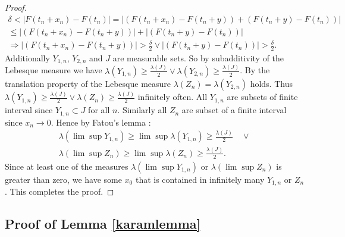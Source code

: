 \documentclass[english,12pt,a4paper,pdftex,sci,utf8]{aaltothesis} %
\begin{document}
\begin{proof}
\begin{equation*}
\begin{split}
\delta < \left| F(t_n+x_n) - F(t_n) \right| = \left| (F(t_n+x_n)-F(t_n+y)) + (F(t_n+y)-F(t_n)) \right| \\
\leq \left| (F(t_n+x_n)-F(t_n+y)) \right| + \left| (F(t_n+y)-F(t_n)) \right| \\
\Rightarrow \left| (F(t_n+x_n)-F(t_n+y)) \right|>\frac{\delta}{2} \lor \left| (F(t_n+y)-F(t_n)) \right|>\frac{\delta}{2}.
\end{split}
\end{equation*}
Additionally $Y_{1,n}$, $Y_{2,n}$ and $J$ are measurable sets. So by subadditivity of the Lebesque measure we have $\lambda(Y_{1,n}) \geq \frac{\lambda(J)}{2} \lor \lambda(Y_{2,n}) \geq \frac{\lambda(J)}{2}$. By the translation property of the Lebesque measure $\lambda(Z_n)=\lambda(Y_{2,n})$ holds. Thus $\lambda(Y_{1,n}) \geq \frac{\lambda(J)}{2} \lor \lambda(Z_n) \geq \frac{\lambda(J)}{2}$ infinitely often. All $Y_{1,n}$ are subsets of finite interval since $Y_{1,n} \subset J$ for all $n$. Similarly all $Z_n$ are subset of a finite interval since $x_n \rightarrow 0$. Hence by Fatou's lemma \cite{lahiri}:
\begin{equation*}
\begin{split}
\lambda(\lim \sup Y_{1,n}) \geq \lim \sup \lambda(Y_{1,n}) \geq \frac{\lambda(J)}{2}  \quad \lor \\
\lambda(\lim \sup Z_{n}) \geq \lim \sup \lambda(Z_{n}) \geq \frac{\lambda(J)}{2}.
\end{split}
\label{fatouapply}
\end{equation*}
Since at least one of the measures $\lambda(\lim \sup Y_{1,n})$ or $\lambda(\lim \sup Z_{n})$ is greater than zero, we have some $x_0$ that is contained in infinitely many $Y_{1,n}$ or $Z_n$. This completes the proof.
\end{proof}

\subsection{Proof of Lemma \ref{karamlemma}}
\end{document}
